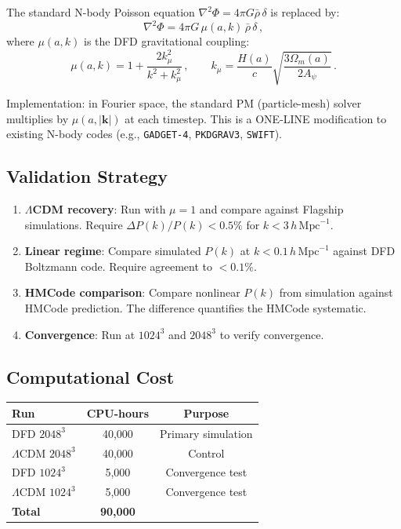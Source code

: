 \documentclass[11pt,a4paper]{article}
\begin{document}
The standard N-body Poisson equation $\nabla^2\Phi = 4\pi G \bar{\rho}\,\delta$ is replaced by:
\begin{equation}
\nabla^2\Phi = 4\pi G\,\mu(a, k)\,\bar{\rho}\,\delta\,,
\end{equation}
where $\mu(a,k)$ is the DFD gravitational coupling:
\begin{equation}
\mu(a,k) = 1 + \frac{2k_\mu^2}{k^2 + k_\mu^2}\,, \qquad k_\mu = \frac{H(a)}{c}\sqrt{\frac{3\Omega_m(a)}{2A_\psi}}\,.
\end{equation}

Implementation: in Fourier space, the standard PM (particle-mesh) solver multiplies by $\mu(a, |\mathbf{k}|)$ at each timestep. This is a ONE-LINE modification to existing N-body codes (e.g., \texttt{GADGET-4}, \texttt{PKDGRAV3}, \texttt{SWIFT}).

\subsection{Validation Strategy}

\begin{enumerate}
\item \textbf{$\Lambda$CDM recovery}: Run with $\mu = 1$ and compare against Flagship simulations. Require $\Delta P(k)/P(k) < 0.5\%$ for $k < 3\,h\,\mathrm{Mpc}^{-1}$.
\item \textbf{Linear regime}: Compare simulated $P(k)$ at $k < 0.1\,h\,\mathrm{Mpc}^{-1}$ against DFD Boltzmann code. Require agreement to $< 0.1\%$.
\item \textbf{HMCode comparison}: Compare nonlinear $P(k)$ from simulation against HMCode prediction. The difference quantifies the HMCode systematic.
\item \textbf{Convergence}: Run at $1024^3$ and $2048^3$ to verify convergence.
\end{enumerate}

\subsection{Computational Cost}

\begin{center}
\begin{tabular}{lcc}
\toprule
\textbf{Run} & \textbf{CPU-hours} & \textbf{Purpose} \\
\midrule
DFD $2048^3$ & 40,000 & Primary simulation \\
$\Lambda$CDM $2048^3$ & 40,000 & Control \\
DFD $1024^3$ & 5,000 & Convergence test \\
$\Lambda$CDM $1024^3$ & 5,000 & Convergence test \\
\midrule
\textbf{Total} & \textbf{90,000} & \\
\bottomrule
\end{tabular}
\end{center}
\end{document}
